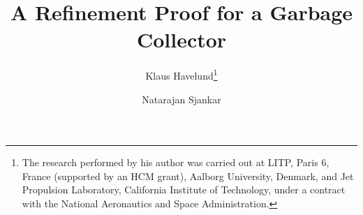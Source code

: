 \documentclass{llncs}
\begin{document}
\title{A Refinement Proof for a Garbage Collector}

\author{ 
Klaus Havelund\thanks{The research 
performed by his author was carried out at
LITP, Paris 6, France (supported by an HCM grant), 
Aalborg University, Denmark,
and Jet Propulsion Laboratory, California 
Institute of Technology, under a contract with the National Aeronautics 
and Space Administration.}
\and
Natarajan Sjankar
}





\maketitle













\appendix
{}


\end{document}
